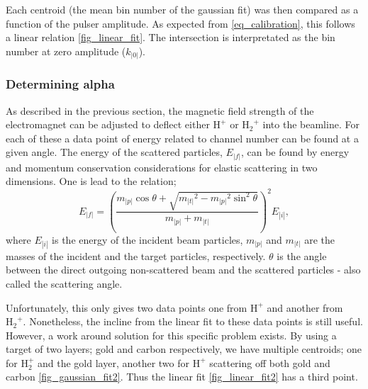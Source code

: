 Each centroid (the mean bin number of the gaussian fit) was then compared as a
function of the pulser amplitude. As expected from \cref{eq_calibration}, this
follows a linear relation \cref{fig_linear_fit}.
The intersection is interpretated as the bin number at zero amplitude ($k_|0|$).


 
\subsubsection{Determining alpha}
As described in the previous section, the magnetic field strength of the
electromagnet can be adjusted to deflect either $\mathrm{H^+}$ or
$\mathrm{{H_2}^+}$ into the beamline. For each of these a data point of energy
related to channel number can be found at a given angle.
The energy of the scattered particles, $E_|f|$, can be found by energy and
momentum conservation considerations for elastic scattering in two dimensions.
One is lead to the relation;
\begin{equation}
E_|f| = \left( \frac{m_|p| \cos\theta + \sqrt{{m_|t|}^2 - {m_|p|}^2
\sin^2\theta}}{m_|p|+m_|t|} \right)^2 E_|i|,
\label{eq_5}
\end{equation}
where $E_|i|$ is the energy of the incident beam particles, $m_|p|$ and $m_|t|$ are
the masses of the incident and the target particles, respectively. 
$\theta$ is the angle between the direct outgoing non-scattered beam and the
scattered particles - also called the scattering angle.

Unfortunately, this only gives two data points one from $\mathrm{H^+}$ and
another from $\mathrm{{H_2}^+}$. Nonetheless, the incline from the linear fit
to these data points is still useful. However, a work around solution
for this specific problem exists. By using a target of two layers; gold and carbon
respectively, we have multiple centroids; one for $\mathrm{H_2^+}$ and the gold
layer, another two for $\mathrm{H^+}$
scattering off both gold and carbon \cref{fig_gaussian_fit2}. Thus the linear fit
\cref{fig_linear_fit2} has a third point.


